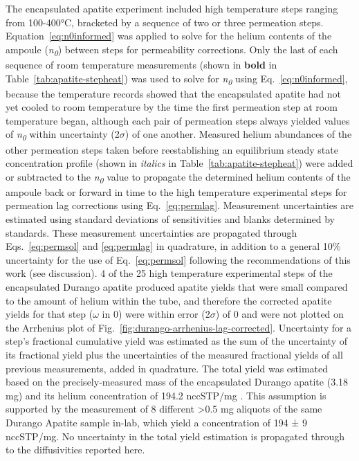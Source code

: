 The encapsulated apatite experiment included high temperature steps ranging from 100-400°C, bracketed by a sequence of two or three permeation steps. Equation~\eqref{eq:n0informed} was applied to solve for the helium contents of the ampoule (\emph{n\textsubscript{0}}) between steps for permeability corrections. Only the last of each sequence of room temperature measurements (shown in \textbf{bold} in Table~\ref{tab:apatite-stepheat}) was used to solve for \emph{n\textsubscript{0}} using Eq.~\eqref{eq:n0informed}, because the temperature records showed that the encapsulated apatite had not yet cooled to room temperature by the time the first permeation step at room temperature began, although each pair of permeation steps always yielded values of \emph{n\textsubscript{0}} within uncertainty (2$\sigma$) of one another. Measured helium abundances of the other permeation steps taken before reestablishing an equilibrium steady state concentration profile (shown in \emph{italics} in Table~\ref{tab:apatite-stepheat}) were added or subtracted to the \emph{n\textsubscript{0 }}value to propagate the determined helium contents of the ampoule back or forward in time to the high temperature experimental steps for permeation lag corrections using Eq.~\eqref{eq:permlag}. Measurement uncertainties are estimated using standard deviations of sensitivities and blanks determined by standards. These measurement uncertainties are propagated through Eqs.~\eqref{eq:permsol} and \eqref{eq:permlag} in quadrature, in addition to a general 10\% uncertainty for the use of Eq.~\eqref{eq:permsol} following the recommendations of this work (see discussion). 4 of the 25 high temperature experimental steps of the encapsulated Durango apatite produced apatite yields that were small compared to the amount of helium within the tube, and therefore the corrected apatite yields for that step ($\omega$ in 0) were within error (2$\sigma$) of 0 and were not plotted on the Arrhenius plot of Fig.~\ref{fig:durango-arrhenius-lag-corrected}. Uncertainty for a step's fractional cumulative yield was estimated as the sum of the uncertainty of its fractional yield plus the uncertainties of the measured fractional yields of all previous measurements, added in quadrature. The total yield was estimated based on the precisely-measured mass of the encapsulated Durango apatite (3.18 mg) and its helium concentration of 194.2 nccSTP/mg \citep{farley2000}. This assumption is supported by the measurement of 8 different \textgreater0.5 mg aliquots of the same Durango Apatite sample in-lab, which yield a concentration of 194 ± 9 nccSTP/mg. No uncertainty in the total yield estimation is propagated through to the diffusivities reported here.

